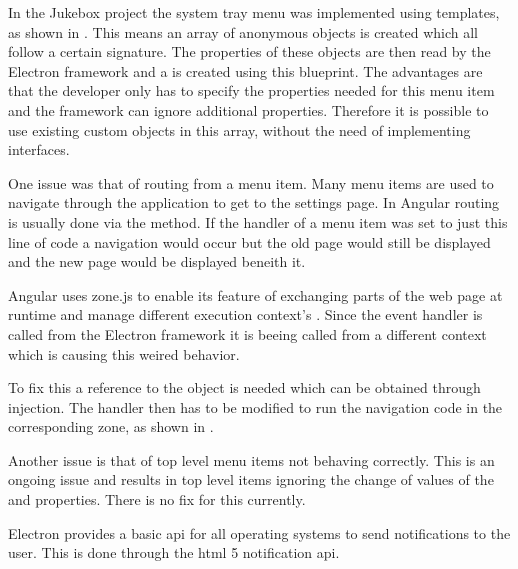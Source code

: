 
In the Jukebox project the system tray menu was implemented using templates, as shown in . This means an array of anonymous objects is created which all follow a certain signature. The properties of these objects are then read by the Electron framework and a  is created using this blueprint. The advantages are that the developer only has to specify the properties needed for this menu item and the framework can ignore additional properties. Therefore it is possible to use existing custom objects in this array, without the need of implementing interfaces.


One issue was that of routing from a menu item. Many menu items are used to navigate through the application \zB to get to the settings page. In Angular routing is usually done via the  method. If the  handler of a menu item was set to just this line of code a navigation would occur but the old page would still be displayed and the new page would be displayed beneith it.

Angular uses zone.js to enable its  feature of exchanging parts of the web page at runtime and manage different execution context's \cite{zoneJS}. Since the  event handler is called from the Electron framework it is beeing called from a different context which is causing this weired behavior.

To fix this a reference to the  object is needed which can be obtained through injection. The  handler then has to be modified to run the navigation code in the corresponding zone, as shown in .


Another issue is that of top level menu items not behaving correctly. This is an ongoing issue and results in top level items ignoring the change of values of the  and  properties. There is no fix for this currently. \cite{topMenuItems}


Electron provides a basic \gls{api} for all operating systems to send notifications to the user. This is done through the \gls{html} 5 notification \gls{api}.


